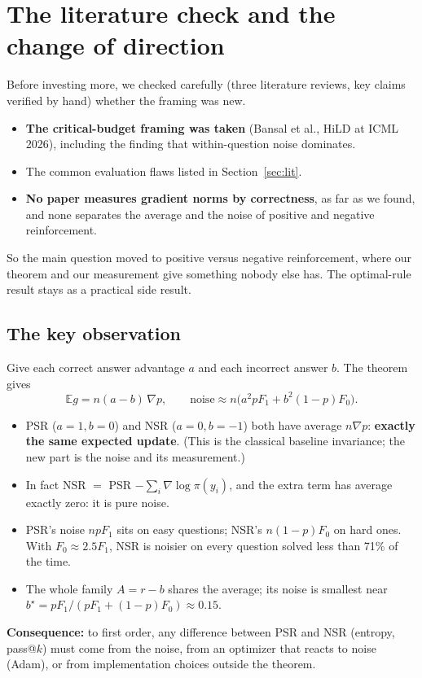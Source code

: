 \documentclass[11pt]{article}
\newcommand{\E}{\mathbb{E}}
\begin{document}
\section{The literature check and the change of direction}

\begin{why}
Before investing more, we checked carefully (three literature reviews, key claims verified by hand) whether the framing was new.
\end{why}
\begin{found}
\begin{itemize}[leftmargin=*,itemsep=1pt]
\item \textbf{The critical-budget framing was taken} (Bansal et al., HiLD at ICML 2026), including the finding that within-question noise dominates.
\item The common evaluation flaws listed in Section~\ref{sec:lit}.
\item \textbf{No paper measures gradient norms by correctness}, as far as we found, and none separates the average and the noise of positive and negative reinforcement.
\end{itemize}
\end{found}
So the main question moved to positive versus negative reinforcement, where our theorem and our measurement give something nobody else has. The optimal-rule result stays as a practical side result.

\subsection{The key observation}
Give each correct answer advantage $a$ and each incorrect answer $b$. The theorem gives
\[
\E g = n(a-b)\,\nabla p,\qquad \text{noise}\approx n\big(a^2pF_1+b^2(1-p)F_0\big).
\]
\begin{itemize}[leftmargin=*,itemsep=1pt]
\item PSR ($a=1,b=0$) and NSR ($a=0,b=-1$) both have average $n\nabla p$: \textbf{exactly the same expected update}. (This is the classical baseline invariance; the new part is the noise and its measurement.)
\item In fact NSR $=$ PSR $-\sum_i\nabla\log\pi(y_i)$, and the extra term has average exactly zero: it is pure noise.
\item PSR's noise $npF_1$ sits on easy questions; NSR's $n(1-p)F_0$ on hard ones. With $F_0\approx2.5F_1$, NSR is noisier on every question solved less than 71\% of the time.
\item The whole family $A=r-b$ shares the average; its noise is smallest near $b^\star=pF_1/(pF_1+(1-p)F_0)\approx0.15$.
\end{itemize}
\textbf{Consequence:} to first order, any difference between PSR and NSR (entropy, pass@$k$) must come from the noise, from an optimizer that reacts to noise (Adam), or from implementation choices outside the theorem.
\end{document}
